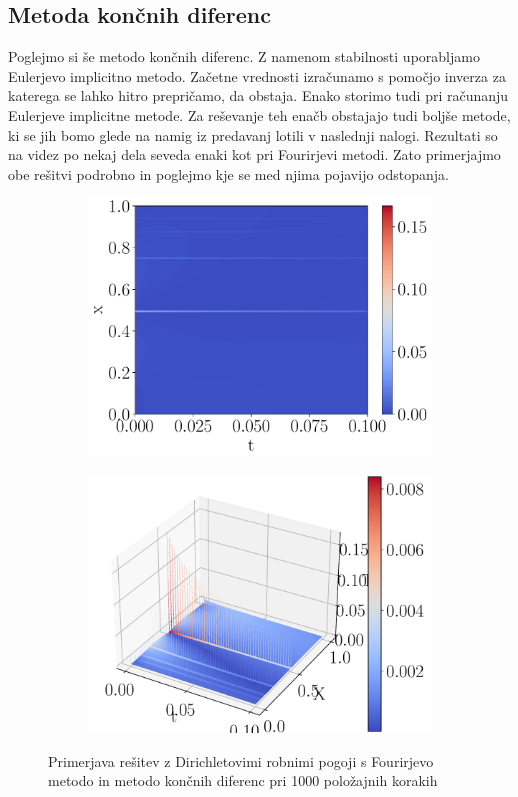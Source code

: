 \documentclass{article}
\begin{document}
\subsection{Metoda končnih diferenc}
Poglejmo si še metodo končnih diferenc. Z namenom stabilnosti uporabljamo Eulerjevo implicitno metodo. Začetne vrednosti izračunamo s pomočjo inverza za katerega se lahko hitro prepričamo, da obstaja. Enako storimo tudi pri računanju Eulerjeve implicitne metode. Za reševanje teh enačb obstajajo tudi boljše metode, ki se jih bomo glede na namig iz predavanj lotili v naslednji nalogi. Rezultati so na videz po nekaj dela seveda enaki kot pri Fourirjevi metodi. Zato primerjajmo obe rešitvi podrobno in poglejmo kje se med njima pojavijo odstopanja.
\begin{figure}[H]
    \centering
    \begin{subfigure}{0.45\textwidth}
        \centering
        \includegraphics[width=\linewidth]{diff2d.pdf}
    \end{subfigure}
    \hspace{0.5cm}
    \begin{subfigure}{0.45\textwidth}
        \centering
        \includegraphics[width=\linewidth]{diff3d.pdf}
    \end{subfigure}
	\caption{Primerjava rešitev z Dirichletovimi robnimi pogoji s Fourirjevo metodo in metodo končnih diferenc pri 1000 položajnih korakih}
\end{figure}
\end{document}
